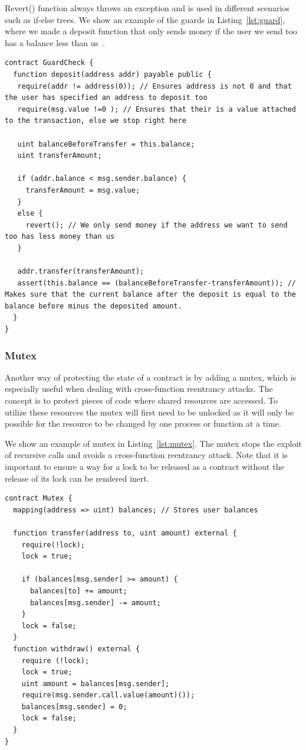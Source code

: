 \documentclass[10pt,conference]{IEEEtran}
\begin{document}
Revert() function always throws an exception and is used in different scenarios such as if-else trees. We show an example of the guards in Listing~\ref{lst:guard}, where we made a deposit function that only sends money if the user we send too has a balance less than us~\cite{guardcheck}.

\begin{lstlisting}[language=Solidity, caption=Guard Check pattern, label={lst:guard}]
contract GuardCheck {
  function deposit(address addr) payable public {
   require(addr != address(0)); // Ensures address is not 0 and that the user has specified an address to deposit too
   require(msg.value !=0 ); // Ensures that their is a value attached to the transaction, else we stop right here
        
   uint balanceBeforeTransfer = this.balance;
   uint transferAmount;
        
   if (addr.balance < msg.sender.balance) {
     transferAmount = msg.value;
   }
   else {
     revert(); // We only send money if the address we want to send too has less money than us
   }
        
   addr.transfer(transferAmount);
   assert(this.balance == (balanceBeforeTransfer-transferAmount)); // Makes sure that the current balance after the deposit is equal to the balance before minus the deposited amount. 
  }  
}
\end{lstlisting}

\subsubsection{Mutex}

Another way of protecting the state of a contract is by adding a mutex, which is especially useful when dealing with cross-function reentrancy attacks. The concept is to protect pieces of code where shared resources are accessed. To utilize these resources the mutex will first need to be unlocked as it will only be possible for the resource to be changed by one process or function at a time. 

We show an example of mutex in Listing~\ref{lst:mutex}. The mutex stops the exploit of recursive calls and avoids a cross-function reentrancy attack. Note that it is important to ensure a way for a lock to be released as a contract without the release of its lock can be rendered inert.

\begin{lstlisting}[language=Solidity, caption=Mutual exclusion, label={lst:mutex}]
contract Mutex {
  mapping(address => uint) balances; // Stores user balances

  function transfer(address to, uint amount) external {
    require(!lock);
    lock = true;
        
    if (balances[msg.sender] >= amount) {
      balances[to] += amount;
      balances[msg.sender] -= amount;
    }
    lock = false;
  }
  function withdraw() external {
    require (!lock);
    lock = true;
    uint amount = balances[msg.sender];
    require(msg.sender.call.value(amount)());
    balances[msg.sender] = 0;
    lock = false;
  }
}
\end{lstlisting}
\end{document}
